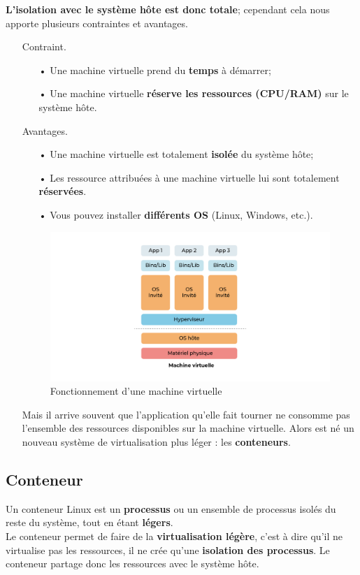 \documentclass[12pt,a4paper]{article}
\begin{document}
\textbf{L'isolation avec le système hôte est donc totale}; cependant cela nous apporte 
plusieurs contraintes et avantages.
\begin{itemize}
\item[] Contraint.
\begin{itemize}
\item[•] Une machine virtuelle prend du \textbf{temps} à démarrer;
\item[•] Une machine virtuelle \textbf{réserve les ressources (CPU/RAM)} sur le système 
hôte.
\end{itemize}
\item[] Avantages.
\begin{itemize}
\item[•] Une machine virtuelle est totalement \textbf{isolée} du système hôte;
\item[•] Les ressource attribuées à une machine virtuelle lui sont totalement \textbf{réservées}.
\item[•] Vous pouvez installer \textbf{différents OS} (Linux, Windows, etc.).
\end{itemize}

\begin{figure}
\centering
\includegraphics[scale=0.3]{img/vm.png}
\caption{Fonctionnement d'une machine virtuelle}
\label{Tux}
\end{figure}

Mais il arrive souvent que l'application qu'elle fait tourner ne consomme pas l'ensemble 
des ressources disponibles sur la machine virtuelle. Alors est né un nouveau système de 
virtualisation plus léger : les \textbf{conteneurs}.
\end{itemize}
\subsection{Conteneur}
Un conteneur Linux est un \textbf{processus} ou un ensemble de processus isolés du reste du
système, tout en étant \textbf{légers}.\\
Le conteneur permet de faire de la \textbf{virtualisation légère}, c'est à dire qu'il ne virtualise pas les ressources, il ne crée qu'une \textbf{isolation des processus}. Le conteneur partage donc les ressources avec le système hôte.\\
\end{document}
